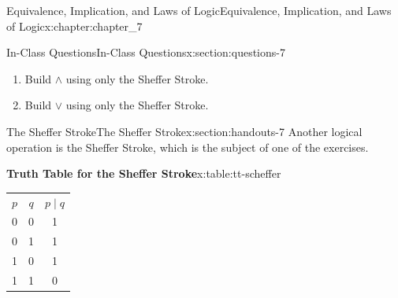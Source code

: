 \documentclass[oneside,10pt,]{book}
\newcommand{\tabularfont}{\relax}
\numberwithin{equation}{section}
\begin{document}
\begin{chapterptx}{Equivalence, Implication, and Laws of Logic}{}{Equivalence, Implication, and Laws of Logic}{}{}{x:chapter:chapter_7}
\begin{sectionptx}{In-Class Questions}{}{In-Class Questions}{}{}{x:section:questions-7}
\begin{enumerate}[label=\arabic*.]
\begin{enumerate}[label=(\alph*)]
\item{}Build \(\land\) using only the Sheffer Stroke.%
\item{}Build \(\lor\) using only the Sheffer Stroke.%
\end{enumerate}
%
\end{enumerate}
%
\end{sectionptx}
%
%
\typeout{************************************************}
\typeout{************************************************}
%
\begin{sectionptx}{The Sheffer Stroke}{}{The Sheffer Stroke}{}{}{x:section:handouts-7}
%
Another logical operation is the Sheffer Stroke, which is the subject of one of the exercises.%
\begin{tableptx}{\textbf{Truth Table for the Sheffer Stroke}}{x:table:tt-scheffer}{}%
\centering
{\tabularfont%
\begin{tabular}{ccc}
\(p\)&\(q\)&\(p \mid q\)\tabularnewline[0pt]
0&0&1\tabularnewline[0pt]
0&1&1\tabularnewline[0pt]
1&0&1\tabularnewline[0pt]
1&1&0
\end{tabular}
}%
\end{tableptx}%
\end{sectionptx}
\end{chapterptx}
%
%
\typeout{************************************************}
\typeout{************************************************}
%
\end{document}
